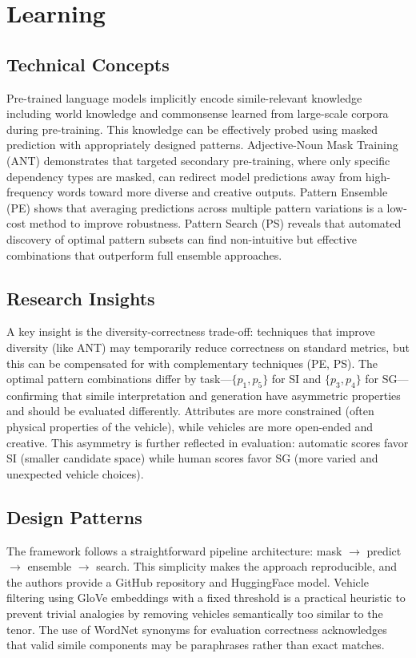 \documentclass[12pt]{article}
\begin{document}
\section{Learning}

\subsection{Technical Concepts}

Pre-trained language models implicitly encode simile-relevant knowledge including world knowledge and commonsense learned from large-scale corpora during pre-training. This knowledge can be effectively probed using masked prediction with appropriately designed patterns. Adjective-Noun Mask Training (ANT) demonstrates that targeted secondary pre-training, where only specific dependency types are masked, can redirect model predictions away from high-frequency words toward more diverse and creative outputs. Pattern Ensemble (PE) shows that averaging predictions across multiple pattern variations is a low-cost method to improve robustness. Pattern Search (PS) reveals that automated discovery of optimal pattern subsets can find non-intuitive but effective combinations that outperform full ensemble approaches.

\subsection{Research Insights}

A key insight is the diversity-correctness trade-off: techniques that improve diversity (like ANT) may temporarily reduce correctness on standard metrics, but this can be compensated for with complementary techniques (PE, PS). The optimal pattern combinations differ by task---$\{p_1, p_5\}$ for SI and $\{p_3, p_4\}$ for SG---confirming that simile interpretation and generation have asymmetric properties and should be evaluated differently. Attributes are more constrained (often physical properties of the vehicle), while vehicles are more open-ended and creative. This asymmetry is further reflected in evaluation: automatic scores favor SI (smaller candidate space) while human scores favor SG (more varied and unexpected vehicle choices).

\subsection{Design Patterns}

The framework follows a straightforward pipeline architecture: mask $\rightarrow$ predict $\rightarrow$ ensemble $\rightarrow$ search. This simplicity makes the approach reproducible, and the authors provide a GitHub repository and HuggingFace model. Vehicle filtering using GloVe embeddings with a fixed threshold is a practical heuristic to prevent trivial analogies by removing vehicles semantically too similar to the tenor. The use of WordNet synonyms for evaluation correctness acknowledges that valid simile components may be paraphrases rather than exact matches.
\end{document}
